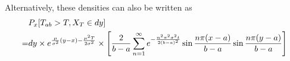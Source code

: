 Alternatively, these densities can also be written as
%
\begin{align}  \label{E:prob_drift_notouch_alt}
	& P_x[T_{ab}>T, X_T\in dy]  \notag \\
	=& dy\times e^{\frac{\mu}{\sigma^2}(y-x)-\frac{\mu^2 T}{2\sigma^2}} \times
	   \left[
	     \frac{2}{b-a} 
		   \sum_{n=1}^{\infty} e^{-\frac{n^2\pi^2 \sigma^2 t}{2(b-a)^2}}
		 	 \sin \frac{n\pi (x-a)}{b-a} \sin \frac{n\pi (y-a)}{b-a}
		\right]
\end{align}

